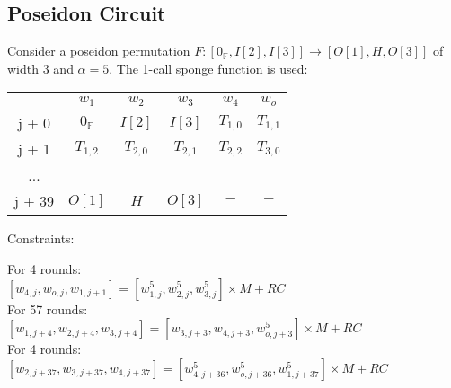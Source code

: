 \subsection{Poseidon Circuit}
\label{section:poseidon}
Consider a poseidon permutation $F: [0_{\mathbb{F}}, I[2], I[3]] \rightarrow [O[1], H, O[3]]$ of width $3$ and $\alpha = 5$.
The 1-call sponge function is used:
\begin{center}
    \begin{tabular}{ c|c|c|c|c|c }
        & $w_1$            & $w_2$     & $w_3$     & $w_4$     & $w_o$     \\
        \hline
        j + 0  & $0_{\mathbb{F}}$ & $I[2]$    & $I[3]$    & $T_{1,0}$ & $T_{1,1}$ \\
        j + 1  & $T_{1,2}$        & $T_{2,0}$ & $T_{2,1}$ & $T_{2,2}$ & $T_{3,0}$ \\
        ...    &                  &           &           &           &           \\
        j + 39 & $O[1]$           & $H$       & $O[3]$    & $-$       & $-$       \\
    \end{tabular}
\end{center}
Constraints:
\begin{center}
    For 4 rounds: \\
    $ [w_{4, j}, w_{o, j}, w_{1, j+1}] = [w_{1,j}^5, w_{2,j}^5, w_{3,j}^5] \times M + RC$ \\
    For 57 rounds: \\
    $ [w_{1, j +4}, w_{2, j + 4}, w_{3, j+4}] = [w_{3,j+3}, w_{4,j + 3}, w_{o,j +3}^5] \times M + RC$ \\
    For 4 rounds: \\
    $ [w_{2, j + 37}, w_{3, j + 37}, w_{4, j+37}] = [w_{4,j +36}^5, w_{o,j +36}^5, w_{1,j + 37}^5] \times M + RC$ \\
\end{center}
